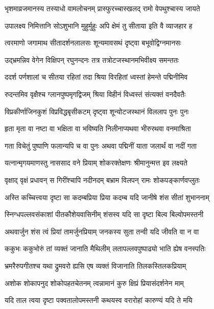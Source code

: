 
\twolineshloka
{भृशमाव्रजमानस्य तस्याधो वामलोचनम्}
{प्रास्फुरच्चास्खलद् रामो वेपथुश्चास्य जायते} %

\twolineshloka
{उपालक्ष्य निमित्तानि सोऽशुभानि मुहुर्मुहुः}
{अपि क्षेमं तु सीताया इति वै व्याजहार ह} %

\twolineshloka
{त्वरमाणो जगामाथ सीतादर्शनलालसः}
{शून्यमावसथं दृष्ट्वा बभूवोद्विग्नमानसः} %

\twolineshloka
{उद्भ्रमन्निव वेगेन विक्षिपन् रघुनन्दनः}
{तत्र तत्रोटजस्थानमभिवीक्ष्य समन्ततः} %

\twolineshloka
{ददर्श पर्णशालां च सीतया रहितां तदा}
{श्रिया विरहितां ध्वस्तां हेमन्ते पद्मिनीमिव} %

\twolineshloka
{रुदन्तमिव वृक्षैश्च ग्लानपुष्पमृगद्विजम्}
{श्रिया विहीनं विध्वस्तं संत्यक्तं वनदैवतैः} %

\twolineshloka
{विप्रकीर्णाजिनकुशं विप्रविद्धबृसीकटम्}
{दृष्ट्वा शून्योटजस्थानं विललाप पुनः पुनः} %

\twolineshloka
{हृता मृता वा नष्टा वा भक्षिता वा भविष्यति}
{निलीनाप्यथवा भीरुरथवा वनमाश्रिता} %

\twolineshloka
{गता विचेतुं पुष्पाणि फलान्यपि च वा पुनः}
{अथवा पद्मिनीं याता जलार्थं वा नदीं गता} %

\twolineshloka
{यत्नान्मृगयमाणस्तु नाससाद वने प्रियाम्}
{शोकरक्तेक्षणः श्रीमानुन्मत्त इव लक्ष्यते} %

\twolineshloka
{वृक्षाद् वृक्षं प्रधावन् स गिरींश्चापि नदीनदम्}
{बभ्राम विलपन् रामः शोकपङ्कार्णवप्लुतः} %

\twolineshloka
{अस्ति कच्चित्त्वया दृष्टा सा कदम्बप्रिया प्रिया}
{कदम्ब यदि जानीषे शंस सीतां शुभाननाम्} %

\twolineshloka
{स्निग्धपल्लवसंकाशां पीतकौशेयवासिनीम्}
{शंसस्व यदि सा दृष्टा बिल्व बिल्वोपमस्तनी} %

\twolineshloka
{अथवार्जुन शंस त्वं प्रियां तामर्जुनप्रियाम्}
{जनकस्य सुता तन्वी यदि जीवति वा न वा} %

\twolineshloka
{ककुभः ककुभोरुं तां व्यक्तं जानाति मैथिलीम्}
{लतापल्लवपुष्पाढ्यो भाति ह्येष वनस्पतिः} %

\twolineshloka
{भ्रमरैरुपगीतश्च यथा द्रुमवरो ह्यसि}
{एष व्यक्तं विजानाति तिलकस्तिलकप्रियाम्} %

\twolineshloka
{अशोक शोकापनुद शोकोपहतचेतनम्}
{त्वन्नामानं कुरु क्षिप्रं प्रियासंदर्शनेन माम्} %

\twolineshloka
{यदि ताल त्वया दृष्टा पक्वतालोपमस्तनी}
{कथयस्व वरारोहां कारुण्यं यदि ते मयि} %


